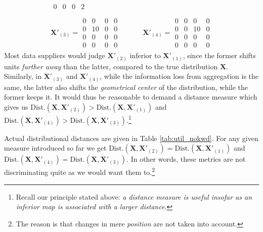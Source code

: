 \begin{tcolorbox}[breakable]
\begin{align*}
\begin{matrix}
                          0 & 0  & 0 & 2 \end{matrix} \\ & \\
\mathbf{X}'_{(3)} = \begin{matrix} 0 & 0  & 0  & 0 \\
                          0 & 10 & 0  & 0 \\
                          0 & 0  & 0  & 0 \\
                          0 & 0  & 0  & 0 \end{matrix} & \hspace{1cm}
\mathbf{X}'_{(4)} = \begin{matrix} 0 & 0  & 0  & 0 \\
                          0 & 0  & 10 & 0 \\
                          0 & 0  & 0  & 0 \\
                          0 & 0  & 0  & 0 \end{matrix}
\end{align*}
Most data suppliers would judge $\mathbf{X}'_{(2)}$ inferior to $\mathbf{X}'_{(1)}$, since the former shifts units \emph{further away} than the latter, compared to the true distribution $\mathbf{X}$. Similarly, in $\mathbf{X}'_{(3)}$ and $\mathbf{X}'_{(4)}$, while the information loss from aggregation is the same, the latter also shifts the \emph{geometrical center} of the distribution, while the former keeps it.
It would thus be reasonable to demand a distance measure which gives us $\mathrm{Dist.}(\mathbf{X}, \mathbf{X}'_{(2)}) > \mathrm{Dist.}(\mathbf{X}, \mathbf{X}'_{(1)})$ and $\mathrm{Dist.}(\mathbf{X}, \mathbf{X}'_{(4)}) > \mathrm{Dist.}(\mathbf{X}, \mathbf{X}'_{(3)})$.\footnote{
    Recall our principle stated above: \textit{a distance measure is useful insofar as an inferior map is associated with a larger distance}.}
    
Actual distributional distances are given in Table \ref{tab:util_nokwd}. 
For any given measure introduced so far we get $\mathrm{Dist.}(\mathbf{X}, \mathbf{X}'_{(2)}) = \mathrm{Dist.}(\mathbf{X}, \mathbf{X}'_{(1)})$ and $\mathrm{Dist.}(\mathbf{X}, \mathbf{X}'_{(4)}) = \mathrm{Dist.}(\mathbf{X}, \mathbf{X}'_{(3)})$. In other words, these metrics are not discriminating quite as we would want them to.\footnote{
    The reason is that changes in mere \emph{position} are not taken into account.}


\end{tcolorbox}
